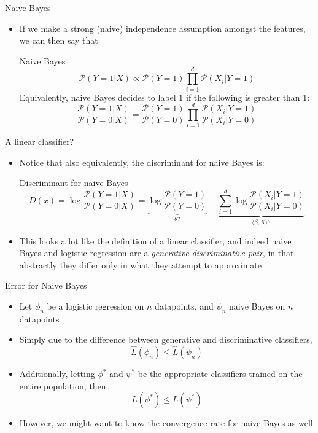 \documentclass{beamer}
\renewcommand{\Pr}[1]{\mathcal{P} \left( #1 \right)}
\newcommand{\an}[1]{\langle #1 \rangle}
\begin{document}
\begin{frame}{Naive Bayes}
\begin{itemize}
\item If we make a strong (naive) independence assumption amongst the features, we can then say that
\begin{block}{Naive Bayes}
\[ \Pr{Y=1|X} \propto \Pr{Y=1} \prod_{i=1}^d \Pr{X_i | Y=1} \]
Equivalently, naive Bayes decides to label $1$ if the following is greater than 1:
\[ \frac{\Pr{Y=1|X}}{\Pr{Y=0|X}} = \frac{\Pr{Y=1}}{\Pr{Y=0}} \prod_{i=1}^d \frac{\Pr{X_i|Y=1}}{\Pr{X_i|Y=0}} \]
\end{block}
\end{itemize}
\end{frame}

\begin{frame}{A linear classifier?}
\begin{itemize}
\item Notice that also equivalently, the discriminant for naive Bayes is:
\begin{block}{Discriminant for naive Bayes}
\[ D(x) = \log \frac{\Pr{Y=1|X}}{\Pr{Y=0|X}} = \underbrace{\log\frac{\Pr{Y=1}}{\Pr{Y=0}}}_{\theta?} +  \underbrace{\sum_{i=1}^d \log \frac{\Pr{X_i|Y=1}}{\Pr{X_i|Y=0}}}_{\an{\beta,X}?} \]
\end{block}
\item This looks a lot like the definition of a linear classifier, and indeed naive Bayes and logistic regression are a \emph{generative-discriminative pair}, in that abstractly they differ only in what they attempt to approximate
\end{itemize}
\end{frame}

\begin{frame}{Error for Naive Bayes}
\begin{itemize}
\item Let $\phi_n$ be a logistic regression on $n$ datapoints, and $\psi_n$ naive Bayes on $n$ datapoints
\item Simply due to the difference between generative and discriminative classifiers,
\[ \hat{L}(\phi_n) \leq \hat{L}(\psi_n) \]
\item Additionally, letting $\phi^*$ and $\psi^*$ be the appropriate classifiers trained on the entire population, then
\[ L(\phi^*) \leq L(\psi^*) \]
\item However, we might want to know the convergence rate for naive Bayes as well
\end{itemize}
\end{frame}
\end{document}

